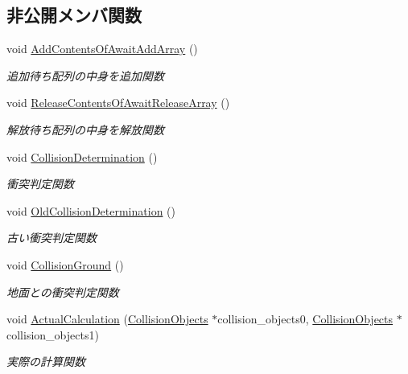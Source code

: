\subsection*{非公開メンバ関数}
\begin{DoxyCompactItemize}
\item 
void \mbox{\hyperlink{class_collision_manager_a53e468bb8624f84a5c65c9779781033f}{Add\+Contents\+Of\+Await\+Add\+Array}} ()
\begin{DoxyCompactList}\small\item\em 追加待ち配列の中身を追加関数 \end{DoxyCompactList}\item 
void \mbox{\hyperlink{class_collision_manager_a351353ddde07f2ff4f6642c8e1fc4ede}{Release\+Contents\+Of\+Await\+Release\+Array}} ()
\begin{DoxyCompactList}\small\item\em 解放待ち配列の中身を解放関数 \end{DoxyCompactList}\item 
void \mbox{\hyperlink{class_collision_manager_a67c1ebc4d4a19e06122f11c3eeec89ec}{Collision\+Determination}} ()
\begin{DoxyCompactList}\small\item\em 衝突判定関数 \end{DoxyCompactList}\item 
void \mbox{\hyperlink{class_collision_manager_a25dbc14dbc709a6bc2dc4424e3965dbe}{Old\+Collision\+Determination}} ()
\begin{DoxyCompactList}\small\item\em 古い衝突判定関数 \end{DoxyCompactList}\item 
void \mbox{\hyperlink{class_collision_manager_a1d67f4076eb71e191db5cff4e5abe3b0}{Collision\+Ground}} ()
\begin{DoxyCompactList}\small\item\em 地面との衝突判定関数 \end{DoxyCompactList}\item 
void \mbox{\hyperlink{class_collision_manager_ab7a212529ce17392d2ca120153318090}{Actual\+Calculation}} (\mbox{\hyperlink{class_collision_objects}{Collision\+Objects}} $\ast$collision\+\_\+objects0, \mbox{\hyperlink{class_collision_objects}{Collision\+Objects}} $\ast$collision\+\_\+objects1)
\begin{DoxyCompactList}\small\item\em 実際の計算関数 \end{DoxyCompactList}\item 

\end{DoxyCompactItemize}
